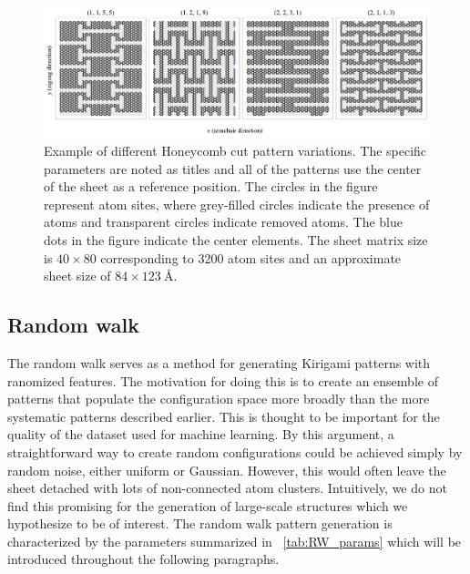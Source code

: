 \begin{figure}[h]
  \centering
  \includegraphics[width=\linewidth]{figures/system/honeycomb_flavors.pdf}
  \caption{Example of different Honeycomb cut pattern variations. The specific parameters are noted as titles and all of the patterns use the center of the sheet as a reference position. The circles in the figure represent atom sites, where grey-filled circles indicate the presence of atoms and transparent circles indicate removed atoms. The blue dots in the figure indicate the center elements. 
  The sheet matrix size is $40 \times 80$ corresponding to 3200 atom sites and an approximate sheet size of $84 \times \SI{123}{\text{Å}}$.}
  \label{fig:honeycomb_flavors}
\end{figure}



\subsection{Random walk}
The random walk serves as a method for generating Kirigami patterns with ranomized features. The motivation for doing this is to create an ensemble of patterns that populate the configuration space more broadly than the more systematic patterns described earlier. This is thought to be important for the quality of the dataset used for machine learning. By this argument, a straightforward way to create random configurations could be achieved simply by random noise, either uniform or Gaussian. However, this would often leave the sheet detached with lots of non-connected atom clusters. Intuitively, we do not find this promising for the generation of large-scale structures which we hypothesize to be of interest. The random walk pattern generation is characterized by the parameters summarized in ~\cref{tab:RW_params} which will be introduced throughout the following paragraphs. 

